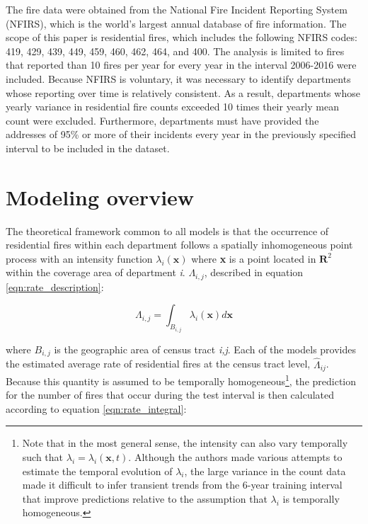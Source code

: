 \documentclass{svjour3}
\begin{document}
The fire data were obtained from the National Fire Incident Reporting System (NFIRS), which is the world's largest annual database of fire information. The scope of this paper is residential fires, which includes the following NFIRS codes: 419, 429, 439, 449, 459, 460, 462, 464, and 400. The analysis is limited to fires that reported than 10 fires per year for every year in the interval 2006-2016 were included. Because NFIRS is voluntary, it was necessary to identify departments whose reporting over time is relatively consistent. As a result, departments whose yearly variance in residential fire counts exceeded 10 times their yearly mean count were excluded. Furthermore, departments must have provided the addresses of 95\% or more of their incidents every year in the previously specified interval to be included in the dataset. 


\section{Modeling overview}
The theoretical framework common to all models is that the occurrence of residential fires within each department follows a spatially inhomogeneous point process with an intensity function $\lambda_{i}(\textbf{x})$ 
where \textbf{x} is a point located in $\textbf{R}^2$ within the coverage area of department \textit{i}. $\Lambda_{i,j}$, described in equation \ref{eqn:rate_description}:

\begin{equation}
  \label{eqn:rate_description}
  \Lambda_{i,j} = \int_{B_{i,j}} \lambda_{i}(\textbf{x})d\textbf{x}
\end{equation}

\noindent where $B_{i,j}$ is the geographic area of census tract \textit{i,j}. Each of the models provides the estimated average rate of residential fires at the census tract level, $\hat\Lambda_{ij}$. Because this quantity is assumed to be temporally homogeneous\footnote{Note that in the most general sense, the intensity can also vary temporally such that $\lambda_i = \lambda_i(\textbf{x},t)$. Although the authors made various attempts to estimate the temporal evolution of $\lambda_i$, the large variance in the count data made it difficult to infer transient trends from the 6-year training interval that improve predictions relative to the assumption that $\lambda_i$ is temporally homogeneous.}, the prediction for the number of fires that occur during the test interval is then calculated according to equation \ref{eqn:rate_integral}: 
\end{document}
